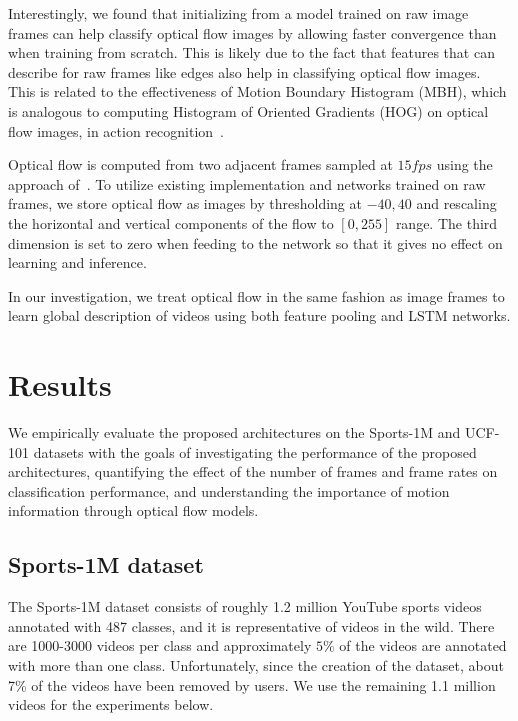 \documentclass[10pt,twocolumn,letterpaper]{article}
\begin{document}
 Interestingly, we found that initializing from a model trained on raw image
 frames can help classify optical flow images by allowing faster convergence
 than when training from scratch. This is likely due to the fact that features that can describe for raw
 frames like edges also help in classifying optical flow images. This is
 related to the effectiveness of Motion Boundary Histogram (MBH), which is analogous to computing Histogram of Oriented Gradients (HOG) on
 optical flow images, in action recognition~\cite{wang13}.

%
Optical flow is computed from two adjacent frames sampled at $15 fps$ using the approach of~\cite{zach07}.
To utilize existing implementation and networks trained on raw frames, we store optical flow as images
by thresholding at $-40, 40$ and rescaling the horizontal and vertical components of the flow to $[0,255]$ range.
The third dimension is set to zero when feeding to the network so that it gives no effect on learning and inference.

 In our investigation, we treat optical flow in the same fashion as image frames to learn global description of videos using both feature pooling and LSTM
networks.


%
\vspace{-1em}\section{Results}\vspace{-1em}\label{sec:results}
We empirically evaluate the proposed architectures on the Sports-1M and UCF-101 datasets with the goals of
investigating the performance of the proposed architectures, quantifying the effect of the number of frames and frame rates on classification
performance, and understanding the importance of motion information through optical flow models.

\vspace{-.6em}\subsection{Sports-1M dataset}\vspace{-.6em}\label{subsec:sports-1m}
The Sports-1M dataset \cite{karpathy2014large} consists of roughly 1.2 million
YouTube sports videos annotated with 487 classes, and it is representative of
videos in the wild. There are 1000-3000 videos per class and approximately
$5\%$ of the videos are annotated with more than one class. Unfortunately,
since the creation of the dataset, about 7\% of the videos have been removed by
users. We use the remaining 1.1 million videos for the experiments below.
\end{document}
